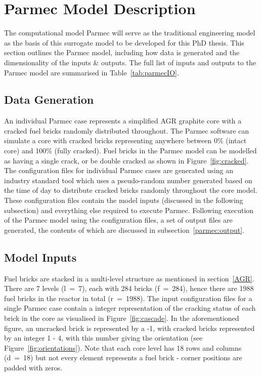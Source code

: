 \section{Parmec Model Description}

The computational model Parmec \cite{wiki:xxx} will serve as the traditional engineering model as the basis of this surrogate model to be developed for this PhD thesis. This section outlines the Parmec model, including how data is generated and the dimensionality of the inputs \& outputs. The full list of inputs and outputs to the Parmec model are summarised in Table~\ref{tab:parmecIO}.

\subsection{Data Generation} \label{parmec:data}

An individual Parmec case represents a simplified AGR graphite core with a cracked fuel bricks randomly distributed throughout. The Parmec software can simulate  a core with cracked bricks representing anywhere between 0\%  (intact core) and 100\% (fully cracked). Fuel bricks in the Parmec model can be modelled as having a single crack, or be double cracked as shown in Figure~\ref{fig:cracked}.  \\

\noindent
The configuration files for individual Parmec cases are generated using an industry standard tool which uses a pseudo-random number generated based on the time of day to distribute cracked bricks randomly throughout the core model. These configuration files contain the model inputs (discussed in the following subsection) and everything else required to execute Parmec. Following execution of the Parmec model using the configuration files, a set of output files are generated, the contents of which are discussed in subsection~\ref{parmec:output}. 

\subsection{Model Inputs} \label{parmec:input}

Fuel bricks are stacked in a multi-level structure as mentioned in section~\ref{AGR}. There are 7 levels (l~=~7), each with 284 bricks (f~=~284), hence there are 1988 fuel bricks in the reactor in total (r~=~1988). The input configuration files for a single Parmec case contain a integer representation of the cracking status of each brick in the core as visualised in Figure~\ref{fig:cascade}. In the aforementioned figure, an uncracked brick is represented by a -1, with cracked bricks represented by an integer 1 - 4, with this number giving the orientation (see Figure~\ref{fig:orientations}). Note that each core level has 18 rows and columns (d~=~18) but not every element represents a fuel brick - corner positions are padded with zeros.
\\

